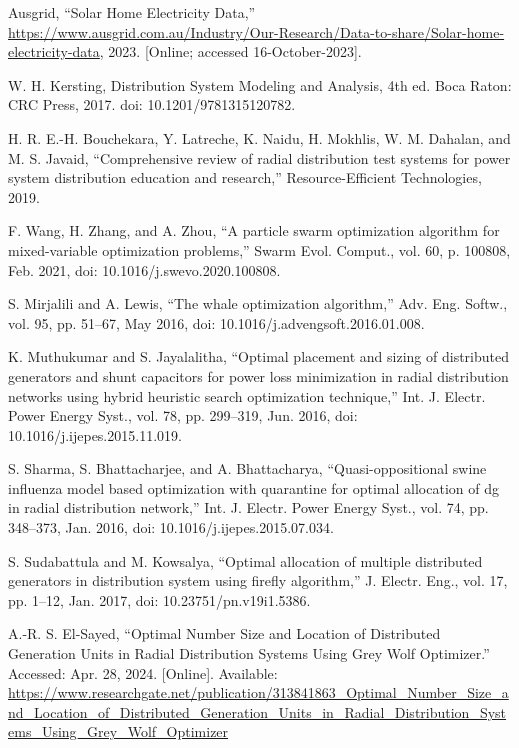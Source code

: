 \documentclass[conference]{IEEEtran}
\begin{document}
\begin{thebibliography}{00}
Ausgrid, ``Solar Home Electricity Data,''
\url{https://www.ausgrid.com.au/Industry/Our-Research/Data-to-share/Solar-home-electricity-data}, 2023. [Online; accessed 16-October-2023].

 W. H. Kersting, Distribution System Modeling and Analysis, 4th ed. Boca Raton: CRC Press, 2017. doi: 10.1201/9781315120782.

 H. R. E.-H. Bouchekara, Y. Latreche, K. Naidu, H. Mokhlis, W. M. Dahalan, and M. S. Javaid, “Comprehensive review of radial distribution test systems for power system distribution education and research,” Resource-Efficient Technologies, 2019.

 F. Wang, H. Zhang, and A. Zhou, “A particle swarm optimization algorithm for mixed-variable optimization problems,” Swarm Evol. Comput., vol. 60, p. 100808, Feb. 2021, doi: 10.1016/j.swevo.2020.100808.

 S. Mirjalili and A. Lewis, “The whale optimization algorithm,” Adv. Eng. Softw., vol. 95, pp. 51–67, May 2016, doi: 10.1016/j.advengsoft.2016.01.008.

 K. Muthukumar and S. Jayalalitha, “Optimal placement and sizing of distributed generators and shunt capacitors for power loss minimization in radial distribution networks using hybrid heuristic search optimization technique,” Int. J. Electr. Power Energy Syst., vol. 78, pp. 299–319, Jun. 2016, doi: 10.1016/j.ijepes.2015.11.019.

 S. Sharma, S. Bhattacharjee, and A. Bhattacharya, “Quasi-oppositional swine influenza model based optimization with quarantine for optimal allocation of dg in radial distribution network,” Int. J. Electr. Power Energy Syst., vol. 74, pp. 348–373, Jan. 2016, doi: 10.1016/j.ijepes.2015.07.034.

 S. Sudabattula and M. Kowsalya, “Optimal allocation of multiple distributed generators in distribution system using firefly algorithm,” J. Electr. Eng., vol. 17, pp. 1–12, Jan. 2017, doi: 10.23751/pn.v19i1.5386.

 A.-R. S. El-Sayed, “Optimal Number Size and Location of Distributed Generation Units in Radial Distribution Systems Using Grey Wolf Optimizer.” Accessed: Apr. 28, 2024. [Online]. Available: \url{https://www.researchgate.net/publication/313841863_Optimal_Number_Size_and_Location_of_Distributed_Generation_Units_in_Radial_Distribution_Systems_Using_Grey_Wolf_Optimizer}


\end{thebibliography}
\end{document}
